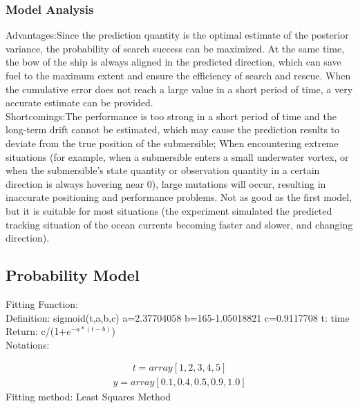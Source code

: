 \documentclass[12pt]{article}  %
\begin{document}
\subsubsection{Model Analysis}
\indent Advantages:Since the prediction quantity is the optimal estimate of the posterior variance, the probability of search success can be maximized. At the same time, the bow of the ship is always aligned in the predicted direction, which can save fuel to the maximum extent and ensure the efficiency of search and rescue. When the cumulative error does not reach a large value in a short period of time, a very accurate estimate can be provided.\\
\indent Shortcomings:The performance is too strong in a short period of time and the long-term drift cannot be estimated, which may cause the prediction results to deviate from the true position of the submersible; When encountering extreme situations (for example, when a submersible enters a small underwater vortex, or when the submersible's state quantity or observation quantity in a certain direction is always hovering near 0), large mutations will occur, resulting in inaccurate positioning and performance problems. Not as good as the first model, but it is suitable for most situations (the experiment simulated the predicted tracking situation of the ocean currents becoming faster and slower, and changing direction).


\subsection{Probability Model}
Fitting Function:\\
\indent Definition: sigmoid(t,a,b,c) a=2.37704058 b=165-1.05018821 c=0.9117708 t: time\\
\indent Return: c/(1+$e^{-a*\left(t-b\right)}$)\\
\indent Notations:

\begin{equation}
    \begin{aligned}
     t=array[1,2,3,4,5]
     \end{aligned}
    \end{equation}
    \begin{equation}
        \begin{aligned}
         y=array[0.1,0.4,0.5,0.9,1.0]
         \end{aligned}
        \end{equation}
      \indent  Fitting method: Least Squares Method
\end{document}
